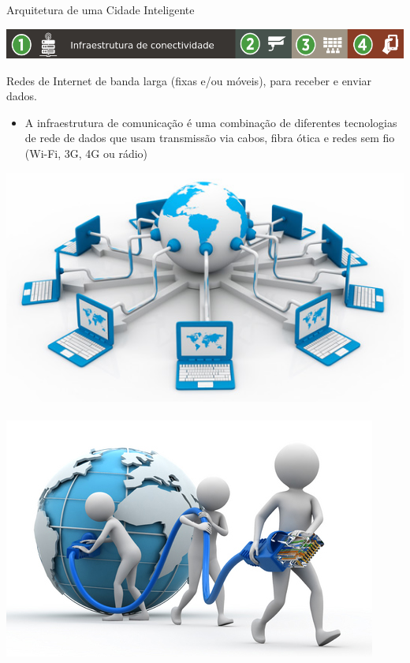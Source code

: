 \documentclass{beamer}
\begin{document}
\begin{frame}{Arquitetura de uma Cidade Inteligente}
\begin{center}
\includegraphics[width=1\textwidth]{img/arquitetura-menu-1.png}  
\end{center}
\begin{exampleblock}{}
Redes de Internet de banda larga (fixas e/ou móveis), para receber e enviar dados.

\begin{itemize}
\item A infraestrutura de comunicação é uma combinação de diferentes tecnologias de rede de dados que usam transmissão via cabos, fibra ótica e redes
sem fio (Wi-Fi, 3G, 4G ou rádio)
\end{itemize}
\end{exampleblock}
\begin{center}
\includegraphics[width=.4\textwidth]{img/internet.jpg}\ \ \ \ \ \ \ \ \ \ \ \ 
\includegraphics[width=.4\textwidth]{img/Internet3.jpg}  
\end{center}



\end{frame}
\end{document}
